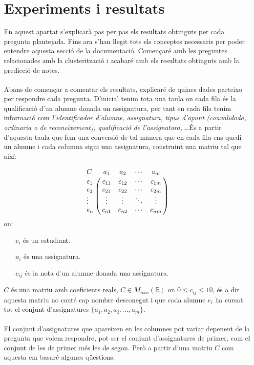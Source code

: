 \documentclass[12pt,a4paper,catalan]{article}
\begin{document}
\section{Experiments i resultats}
En aquest apartat s'explicarà pas per pas els resultats obtinguts per cada pregunta plantejada. Fins ara s'han llegit tots els conceptes necessaris per poder entendre aquesta secció de la documentació. Començaré amb les preguntes relacionades amb la clusterització i acabaré amb els resultats obtinguts amb la predicció de notes.
\\
\\
Abans de començar a comentar els resultats, explicaré de quines dades parteixo per respondre cada pregunta. D'inicial tenim tota una taula on cada fila és la qualificació d'un alumne donada un assignatura, per tant en cada fila tenim informació com \textit{l'identificador d'alumne, assignatura, tipus d'apunt (convalidada, ordinaria o de reconeixement), qualificació de l'assignatura,} \ldots És a partir d'aquesta taula que fem una conversió de tal manera que en cada fila ens quedi un alumne i cada columna sigui una assignatura, construint una matriu tal que així:

$$
\bordermatrix{C &         a_1   &    a_2   &   \cdots    &    a_m  \cr
                  e_1    &  c_{11}  &  c_{12}  &   \cdots    &  c_{1m} \cr
                  e_2    &  c_{21}  &  c_{22}  &   \cdots    &  c_{2m}    \cr
                  \vdots &  \vdots  &  \vdots  &   \ddots    &  \vdots \cr
                  e_n    &  c_{n1}  &  c_{n2}  &   \cdots    &  c_{nm} \cr
                  }
$$
on:
\begin{itemize}[leftmargin=.5in]
	\item [$e_i$] és un estudiant.
	\item [$a_i$] és una assignatura.
	\item [$c_{ij}$] és la nota d'un alumne donada una assignatura.
\end{itemize}

$C$ és una matriu amb coeficients reals, $C\in M_{nxn} (\mathbb{R})$ on $0 \leq c_{ij} \leq 10$, és a dir aquesta matriu no conté cap nombre desconegut i que cada alumne $e_i$ ha cursat tot el conjunt d'assignatures $\{a_1, a_2, a_3, \ldots, a_m\}$.
\\
\\
El conjunt d'assignatures que apareixen en les columnes pot variar depenent de la pregunta que volem respondre, pot ser el conjunt d'assignatures de primer, com el conjunt de les de primer més les de segon. Però a partir d'una matriu $C$ com aquesta em basaré algunes qüestions.
\end{document}
